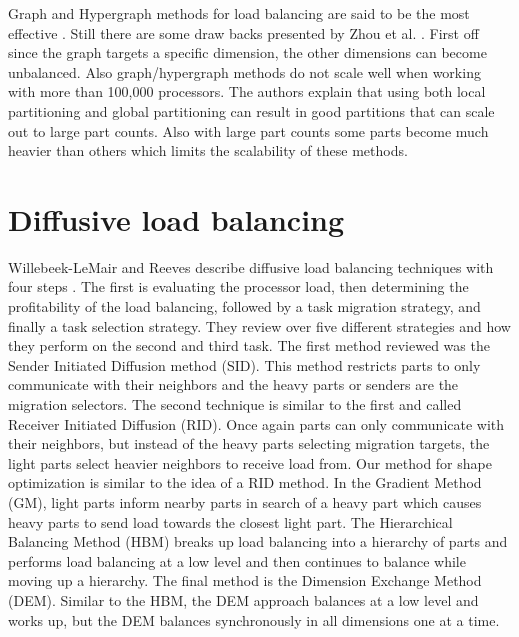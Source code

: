 \documentclass{thesis}
\begin{document}
Graph and Hypergraph methods for load balancing are said to be the most 
effective \cite{zhougraph,surveygraph}. Still there are some draw backs 
presented by Zhou et al. \cite{zhougraph}. First off since the graph targets 
a specific dimension, the other dimensions can become unbalanced. Also 
graph/hypergraph methods do not scale well when working with more than 
100,000 processors. The authors explain that using both local partitioning 
and global partitioning can result in good partitions that can scale out to
large part counts. Also with large part counts some parts become much 
heavier than others which limits the scalability of these methods.

\section{Diffusive load balancing}
Willebeek-LeMair and Reeves describe diffusive load balancing techniques with 
four steps \cite{loadbalance}. The first is evaluating the processor load, then 
determining the profitability of the load balancing, followed by a task 
migration strategy, and finally a task selection strategy. They review over 
five different strategies and how they perform on the second and third task. 
The first method reviewed was the Sender Initiated Diffusion method (SID). 
This method restricts parts to only communicate with their neighbors and the 
heavy parts or senders are the migration selectors. The second technique is 
similar to the first and called Receiver Initiated Diffusion (RID). Once again 
parts can only communicate with their neighbors, but instead of the heavy parts
selecting migration targets, the light parts select heavier neighbors to receive
load from. Our method for shape optimization is similar to the idea of a RID 
method. In the Gradient Method (GM), light parts inform nearby parts in search 
of a heavy part which causes heavy parts to send load towards the closest light 
part. The Hierarchical Balancing Method (HBM) breaks up load balancing into a 
hierarchy of parts and performs load balancing at a low level and then continues
to balance while moving up a hierarchy. The final method is the Dimension 
Exchange Method (DEM). Similar to the HBM, the DEM approach balances at a low 
level and works up, but the DEM balances synchronously in all dimensions one at 
a time.
\end{document}
